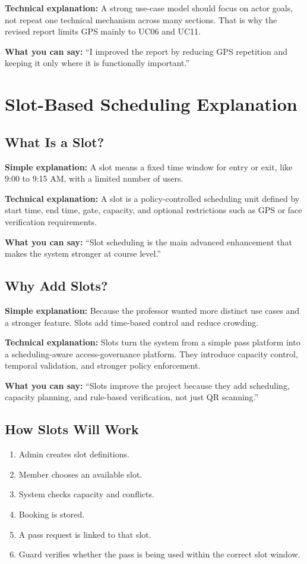 \documentclass[12pt,letterpaper]{article}
\newcommand{\simple}[1]{\textbf{Simple explanation:} #1}
\newcommand{\technical}[1]{\textbf{Technical explanation:} #1}
\newcommand{\say}[1]{\textbf{What you can say:} ``#1''}
\begin{document}
\technical{A strong use-case model should focus on actor goals, not repeat one technical mechanism across many sections. That is why the revised report limits GPS mainly to UC06 and UC11.}

\say{I improved the report by reducing GPS repetition and keeping it only where it is functionally important.}

\section{Slot-Based Scheduling Explanation}

\subsection{What Is a Slot?}

\simple{A slot means a fixed time window for entry or exit, like 9:00 to 9:15 AM, with a limited number of users.}

\technical{A slot is a policy-controlled scheduling unit defined by start time, end time, gate, capacity, and optional restrictions such as GPS or face verification requirements.}

\say{Slot scheduling is the main advanced enhancement that makes the system stronger at course level.}

\subsection{Why Add Slots?}

\simple{Because the professor wanted more distinct use cases and a stronger feature. Slots add time-based control and reduce crowding.}

\technical{Slots turn the system from a simple pass platform into a scheduling-aware access-governance platform. They introduce capacity control, temporal validation, and stronger policy enforcement.}

\say{Slots improve the project because they add scheduling, capacity planning, and rule-based verification, not just QR scanning.}

\subsection{How Slots Will Work}

\begin{enumerate}
    \item Admin creates slot definitions.
    \item Member chooses an available slot.
    \item System checks capacity and conflicts.
    \item Booking is stored.
    \item A pass request is linked to that slot.
    \item Guard verifies whether the pass is being used within the correct slot window.
\end{enumerate}
\end{document}
